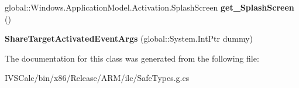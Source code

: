 \begin{DoxyCompactItemize}
\item 
\mbox{\label{class_windows_1_1_application_model_1_1_activation_1_1_share_target_activated_event_args_a1c84d9d210a87e6279fce1cea17244e2}} 
global\+::\+Windows.\+Application\+Model.\+Activation.\+Splash\+Screen {\bfseries get\+\_\+\+Splash\+Screen} ()
\item 
\mbox{\label{class_windows_1_1_application_model_1_1_activation_1_1_share_target_activated_event_args_ac8dc2977a1b7387b5174d423f0f358ff}} 
{\bfseries Share\+Target\+Activated\+Event\+Args} (global\+::\+System.\+Int\+Ptr dummy)
\end{DoxyCompactItemize}


The documentation for this class was generated from the following file\+:\begin{DoxyCompactItemize}
\item 
I\+V\+S\+Calc/bin/x86/\+Release/\+A\+R\+M/ilc/Safe\+Types.\+g.\+cs\end{DoxyCompactItemize}
